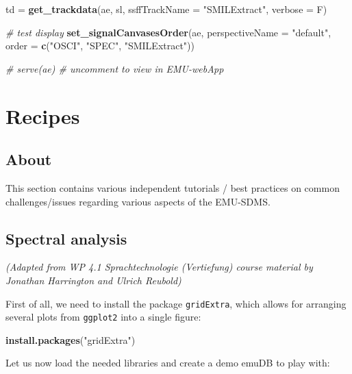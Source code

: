 \documentclass[]{book}
\newenvironment{Shaded}{\begin{snugshade}}{\end{snugshade}}
\newcommand{\CommentTok}[1]{\textcolor[rgb]{0.56,0.35,0.01}{\textit{#1}}}
\newcommand{\DataTypeTok}[1]{\textcolor[rgb]{0.13,0.29,0.53}{#1}}
\newcommand{\KeywordTok}[1]{\textcolor[rgb]{0.13,0.29,0.53}{\textbf{#1}}}
\newcommand{\NormalTok}[1]{#1}
\newcommand{\StringTok}[1]{\textcolor[rgb]{0.31,0.60,0.02}{#1}}
\begin{document}
\begin{Shaded}
\begin{Highlighting}[]
\NormalTok{td =}\StringTok{ }\KeywordTok{get_trackdata}\NormalTok{(ae,}
\NormalTok{                   sl,}
                   \DataTypeTok{ssffTrackName =} \StringTok{"SMILExtract"}\NormalTok{,}
                   \DataTypeTok{verbose =}\NormalTok{ F)}

\CommentTok{# test display}
\KeywordTok{set_signalCanvasesOrder}\NormalTok{(ae,}
                        \DataTypeTok{perspectiveName =} \StringTok{"default"}\NormalTok{,}
                        \DataTypeTok{order =} \KeywordTok{c}\NormalTok{(}\StringTok{"OSCI"}\NormalTok{, }\StringTok{"SPEC"}\NormalTok{, }\StringTok{"SMILExtract"}\NormalTok{))}

\CommentTok{# serve(ae) # uncomment to view in EMU-webApp}
\end{Highlighting}
\end{Shaded}

\hypertarget{part-recipes}{%
\part{Recipes}\label{part-recipes}}

\hypertarget{about}{%
\chapter{About}\label{about}}

This section contains various independent tutorials / best practices on common challenges/issues regarding various aspects of the EMU-SDMS.

\hypertarget{recipe:spectralAnalysis}{%
\chapter{Spectral analysis}\label{recipe:spectralAnalysis}}

\emph{(Adapted from WP 4.1 Sprachtechnologie (Vertiefung) course material by Jonathan Harrington and Ulrich Reubold)}

First of all, we need to install the package \texttt{gridExtra}, which allows for arranging several plots from \texttt{ggplot2} into a single figure:

\begin{Shaded}
\begin{Highlighting}[]
\KeywordTok{install.packages}\NormalTok{(}\StringTok{"gridExtra"}\NormalTok{)}
\end{Highlighting}
\end{Shaded}

Let us now load the needed libraries and create a demo emuDB to play with:
\end{document}
